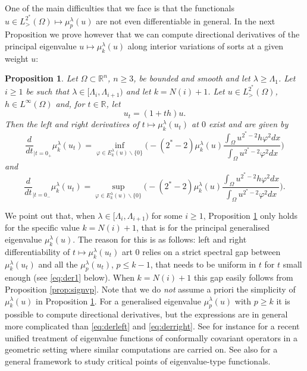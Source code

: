 \documentclass[10pt]{amsart}
\numberwithin{equation}{section}
\newcommand{\R}{\mathbb{R}}
\newcommand{\vp}{\varphi}
\newcommand{\Om}{\Omega}
\newcommand{\mkl}{\mu_{k}^{\lambda}}
\newcommand{\mpl}{\mu_{p}^{\lambda}}
\theoremstyle{plain}
\newtheorem{prop}{Proposition}[section]%
\theoremstyle{remark}
\begin{document}
One of the main difficulties that we face is that the functionals $u \in L^{2^*}_>(\Om) \mapsto \mpl(u)$ are not even differentiable in general. In the next Proposition we prove however that we can compute directional derivatives of the principal eigenvalue $u \mapsto \mkl(u)$ along interior variations of sorts at a given weight $u$:

\begin{prop} \label{prop:dervp}
Let $\Om \subset \R^n$, $n \ge 3$, be bounded and smooth and let  $\lambda \ge \Lambda_1$. Let $i \ge1$ be such that $\lambda \in [\Lambda_i, \Lambda_{i+1})$ and let $k = N(i)+1$. Let $u \in L^{2^*}_>(\Om)$, $h \in L^\infty(\Om)$ and, for $t \in \R$, let 
$$ u_t = (1+th)u. $$
Then the left and right derivatives of $t \mapsto \mkl ( u_t )$ at $0$ exist and are given by
\begin{equation} \label{eq:derleft}
\frac{d}{dt}_{|t=0_+}  \mkl ( u_t) = \inf_{\vp \in E_k^{\lambda}(u)\backslash \{0\}} \Bigg( - (2^*-2) \mkl(u) \frac{\int_\Om u^{2^*-2}h \vp^2dx}{\int_\Om u^{2^*-2} \vp^2 dx}\Bigg)
\end{equation}
and
\begin{equation} \label{eq:derright}
\frac{d}{dt}_{|t=0_-}  \mkl ( u_t) = \sup_{\vp \in E_k^{\lambda}(u)\backslash \{0\}} \Bigg( - (2^*-2) \mkl(u) \frac{\int_\Om u^{2^*-2}h \vp^2dx}{\int_\Om u^{2^*-2} \vp^2 dx}\Bigg).
\end{equation}
\end{prop}
We point out that, when $\lambda \in [\Lambda_i, \Lambda_{i+1})$ for some $i \ge 1$, Proposition \ref{prop:dervp} only holds for the specific value $k = N(i)+1$, that is for the principal generalised eigenvalue $\mkl(u)$. The reason for this is as follows: left and right differentiability of $t \mapsto \mkl(u_t)$ art $0$ relies on a strict spectral gap between $\mkl(u_t)$ and all the $\mpl(u_t)$, $p \le k-1$, that needs to be uniform in $t$ for $t$ small enough (see \eqref{eq:der1} below). When $k = N(i)+1$ this gap easily follows from Proposition \ref{prop:signvp}. Note that we do \emph{not} assume a priori the simplicity of $\mkl(u)$ in Proposition \ref{prop:dervp}. For a generalised eigenvalue $\mu_p^{\lambda}(u)$ with $p \ge k$ it is possible to compute directional derivatives, but the expressions are in general more complicated than \eqref{eq:derleft} and \eqref{eq:derright}. See for instance \cite{HumbertPetridesPremoselli} for a recent unified treatment of eigenvalue functions of conformally covariant operators in a geometric setting where similar computations are carried on. See also \cite{PetridesTewodrose} for a general framework to study critical points of eigenvalue-type functionals. 
\end{document}
